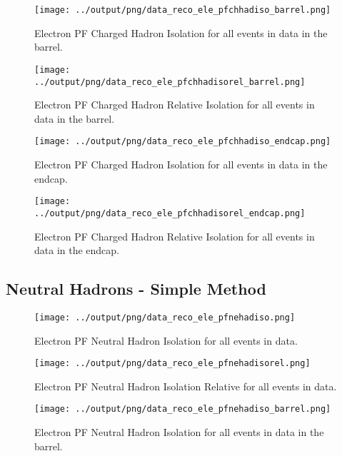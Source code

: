 \documentclass[11pt]{book}
\begin{document}
\begin{figure}[htb]
\centering
\texttt{[image: ../output/png/data\_reco\_ele\_pfchhadiso\_barrel.png]}
\caption{Electron PF Charged Hadron Isolation for all events in data in the barrel.}
\label{fig:data_ele_pfchhadiso_barrel}
\end{figure}

\begin{figure}[htb]
\centering
\texttt{[image: ../output/png/data\_reco\_ele\_pfchhadisorel\_barrel.png]}
\caption{Electron PF Charged Hadron Relative Isolation for all events in data in the barrel.}
\label{fig:data_ele_pfchhadisorel_barrel}
\end{figure}

\begin{figure}[htb]
\centering
\texttt{[image: ../output/png/data\_reco\_ele\_pfchhadiso\_endcap.png]}
\caption{Electron PF Charged Hadron Isolation for all events in data in the endcap.}
\label{fig:data_ele_pfchhadiso_endcap}
\end{figure}

\begin{figure}[htb]
\centering
\texttt{[image: ../output/png/data\_reco\_ele\_pfchhadisorel\_endcap.png]}
\caption{Electron PF Charged Hadron Relative Isolation for all events in data in the endcap.}
\label{fig:data_ele_pfchhadisorel_endcap}
\end{figure}
\clearpage

\subsection{Neutral Hadrons - Simple Method}
\begin{figure}[htb]
\centering
\texttt{[image: ../output/png/data\_reco\_ele\_pfnehadiso.png]}
\caption{Electron PF Neutral Hadron Isolation for all events in data.}
\label{fig:data_ele_pfnehadiso}
\end{figure}

\begin{figure}[htb]
\centering
\texttt{[image: ../output/png/data\_reco\_ele\_pfnehadisorel.png]}
\caption{Electron PF Neutral Hadron Isolation Relative for all events in data.}
\label{fig:data_ele_pfnehadisorel}
\end{figure}

\begin{figure}[htb]
\centering
\texttt{[image: ../output/png/data\_reco\_ele\_pfnehadiso\_barrel.png]}
\caption{Electron PF Neutral Hadron Isolation for all events in data in the barrel.}
\label{fig:data_ele_pfnehadiso_barrel}
\end{figure}
\end{document}
